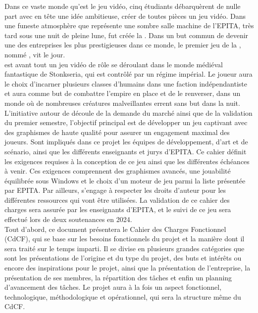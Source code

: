 
Dans ce vaste monde qu’est le jeu vidéo, cinq étudiants débarquèrent de nulle part avec en tête une idée ambitieuse, créer de toutes pièces un jeu vidéo.
Dans une funeste atmosphère que représente une sombre salle machine de l’EPITA, très tard sous une nuit de pleine lune, fut créée la \textit{\companyName}.
Dans un but commun de devenir une des entreprises les plus prestigieuses dans ce monde, le premier jeu de la \textit{\companyName}, nommé \textit{\gameName}, vit le jour.
\\

\textit{\gameName} est avant tout un jeu vidéo de rôle se déroulant dans le monde médiéval fantastique de Stonkseria, qui est contrôlé par un régime impérial.
Le joueur aura le choix d’incarner plusieurs classes d’humains dans une faction indépendantiste et aura comme but de combattre l’empire en place et de le renverser, dans un monde où de nombreuses créatures malveillantes errent sans but dans la nuit.
\\

L'initiative autour de \textit{\gameName} découle de la demande du marché ainsi que de la validation du premier semestre, l’objectif principal est de développer un jeu captivant avec des graphismes de haute qualité pour assurer un engagement maximal des joueurs.
Sont impliqués dans ce projet les équipes de développement, d’art et de scénario, ainsi que les différents enseignants et jurys d’EPITA.
Ce cahier définit les exigences requises à la conception de ce jeu ainsi que les différentes échéances à venir.
Ces exigences comprennent des graphismes avancés, une jouabilité équilibrée sous Windows et le choix d’un moteur de jeu parmi la liste présentée par EPITA.
Par ailleurs, \textit{\companyName} s’engage à respecter les droits d’auteur pour les différentes ressources qui vont être utilisées.
La validation de ce cahier des charges sera assurée par les enseignants d’EPITA, et le suivi de ce jeu sera effectué lors de deux soutenances en 2024.
\\

Tout d’abord, ce document présentera le Cahier des Charges Fonctionnel (CdCF), qui se base sur les besoins fonctionnels du projet et la manière dont il sera traité sur le temps imparti.
Il se divise en plusieurs grandes catégories que sont les présentations de l’origine et du type du projet, des buts et intérêts ou encore des inspirations pour le projet, ainsi que la présentation de l’entreprise, la présentation de ses membres, la répartition des tâches et enfin un planning d’avancement des tâches.
Le projet aura à la fois un aspect fonctionnel, technologique, méthodologique et opérationnel, qui sera la structure même du CdCF.
\\

